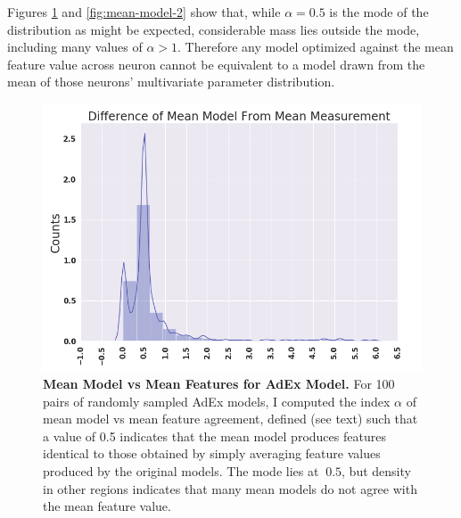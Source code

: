 Figures \ref{fig:mean-model-1} and \ref{fig:mean-model-2} show that, while $\alpha=0.5$ is the mode of the distribution as might be expected, considerable mass lies outside the mode, including many values of $\alpha>1$.
Therefore any model optimized against the mean feature value across neuron cannot be equivalent to a model drawn from the mean of those neurons' multivariate parameter distribution.

\begin{figure}
    \centering
    \includegraphics{figures/mean_model_vs_mean_measurement.png}
    \caption[Mean Model Versus Mean Features for AdEx Model]{\textbf{Mean Model vs Mean Features for AdEx Model.} For 100 pairs of randomly sampled AdEx models, I computed the index $\alpha$ of mean model vs mean feature agreement, defined (see text) such that a value of 0.5 indicates that the mean model produces features identical to those obtained by simply averaging feature values produced by the original models.
    The mode lies at $~0.5$, but density in other regions indicates that many mean models do not agree with the mean feature value.}
    \label{fig:mean-model-1}
\end{figure}

